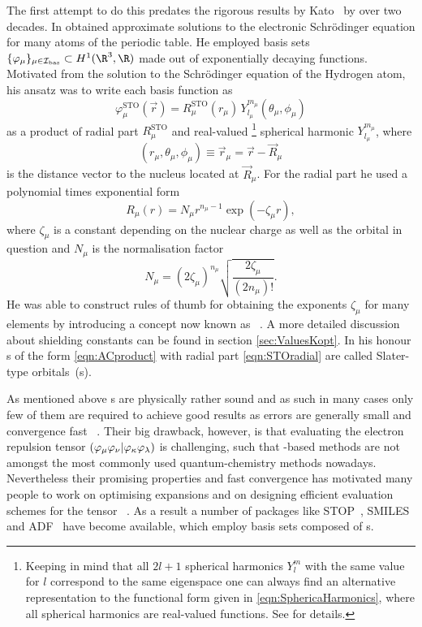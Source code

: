 The first attempt to do this predates the rigorous results by Kato~\cite{Kato1951,Kato1957}
by over two decades.
In \citeyear{Slater1930} \citet{Slater1930}
obtained approximate solutions to the electronic Schrödinger equation
for many atoms of the periodic table.
He employed basis sets $\{\varphi_\mu\}_{\mu\in\Ibas} \subset H^1(\R^3,\R)$
made out of exponentially decaying functions.
Motivated from the solution to the Schrödinger equation of the Hydrogen atom,
his ansatz was to write each basis function as
\begin{equation}
	\varphi^\text{STO}_\mu(\vec{r})
	= R^\text{STO}_\mu(r_\mu) \, Y_{l_\mu}^{m_\mu}(\theta_\mu, \phi_\mu)
	\label{eqn:ACproduct}
\end{equation}
\ie as a product of radial part $R^\text{STO}_\mu$
and real-valued%
\footnote{Keeping in mind that all $2l+1$ spherical harmonics
	$Y_l^m$ with the same value for $l$ correspond to the same eigenspace
	one can always find an alternative representation to the functional
	form given in \eqref{eqn:SphericaHarmonics},
	where all spherical harmonics are real-valued functions.
	See \cite{Avery2018} for details.
} spherical harmonic $Y_{l_\mu}^{m_\mu}$, where
\[ \left(r_\mu, \theta_\mu, \phi_\mu\right) \equiv \vec{r}_\mu = \vec{r} - \vec{R}_\mu \]
is the distance vector to the nucleus located at $\vec{R}_\mu$.
For the radial part he used a polynomial times exponential form
\begin{equation}
	R_\mu(r) = N_\mu r^{n_{\mu}-1} \exp(-\zeta_\mu r),
	\label{eqn:STOradial}
\end{equation}
where $\zeta_\mu$
is a constant depending on the nuclear charge as well as
the orbital in question and
$N_\mu$ is the normalisation factor
\[ N_\mu = \left( 2\zeta_\mu \right)^{n_\mu} \sqrt{\frac{2\zeta_\mu}{(2n_\mu)!}}. \]
He was able to construct rules of thumb for obtaining the exponents $\zeta_\mu$
for many elements by introducing
a concept now known as ~\cite{Slater1930}.
A more detailed discussion about shielding constants
can be found in section \vref{sec:ValuesKopt}.
In his honour {\ETO}s of the form \eqref{eqn:ACproduct}
with radial part \eqref{eqn:STOradial}
are called Slater-type orbitals~({\STO}s).

As mentioned above {\STO}s are physically rather sound
and as such in many cases only few of them are required to achieve good results
as errors are generally small and convergence fast%
~\cite{Shepard2007,Guell2008,Hoggan2009,Hoggan2011}.
Their big drawback, however,
is that evaluating the electron repulsion tensor
$\left( \varphi_\mu \varphi_\nu \middle| \varphi_\kappa \varphi_\lambda \right)$
is challenging,
such that \STO-based methods
are not amongst the most commonly used quantum-chemistry methods nowadays.
Nevertheless their promising properties and fast convergence
has motivated many people to work on optimising \STO expansions
and on designing efficient evaluation schemes for the \ERI tensor%
~\cite{Weniger1983,Hoggan2009,Hoggan2011,Avery2013,Avery2017}.
As a result a number of packages
like STOP~\cite{Bouferguene1996},
SMILES~\cite{FernandezRico2001}
and ADF~\cite{ADF}
have become available,
which employ basis sets composed of {\STO}s.

